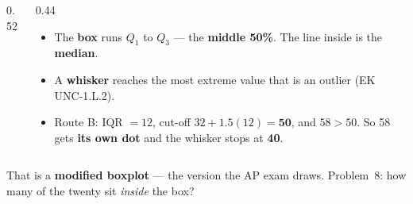 \documentclass[aspectratio=169, 11pt]{beamer}
\begin{document}
\begin{frame}[t, plain]
  \vspace{2pt}
  \begin{columns}[t]
    \begin{column}{0.52\textwidth}
      \begin{center}
      \end{center}
    \end{column}
    \begin{column}{0.44\textwidth}
      \begin{itemize}\setlength{\itemsep}{6pt}
        \item The \textbf{box} runs $Q_1$ to $Q_3$ --- the \textbf{middle 50\%}. The line inside
              is the \textbf{median}.
        \item A \textbf{whisker} reaches the most extreme value that is  an outlier
              (EK UNC-1.L.2).
        \item Route B: IQR $= 12$, cut-off $32 + 1.5(12) = \mathbf{50}$, and $58 > 50$. So 58
              gets \textbf{its own dot} and the whisker stops at \textbf{40}.
      \end{itemize}
    \end{column}
  \end{columns}
  \vspace{6pt}
  \begin{center}
    {\small\color{slate} That is a \textbf{modified boxplot} --- the version the AP exam draws.
    Problem~8: how many of the twenty sit \emph{inside} the box?}
  \end{center}
\end{frame}
\end{document}
